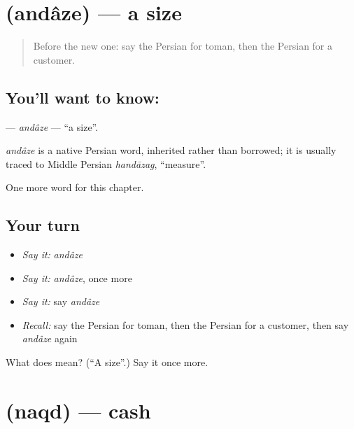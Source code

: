 \section[\texorpdfstring{\fa{اندازه} (andâze)}{اندازه (andâze)}]{ (andâze) — a size}

\label{lesson:FA-C166-andaze}



\begin{quote}
Before the new one: say the Persian for toman, then the Persian for a customer.
\end{quote}

\subsection*{You'll want to know: }
\textbf{} — \emph{andâze} — \textquotedblleft{}a size\textquotedblright{}.

\begin{cousinweb}
\emph{andâze} is a native Persian word, inherited rather than borrowed; it is usually traced to Middle Persian \emph{handāzag}, \textquotedblleft{}measure\textquotedblright{}.
\end{cousinweb}

\begin{grammarlens}[title={What you've built}]
One more word for this chapter.
\end{grammarlens}

\subsection*{Your turn}
\begin{itemize}
\raggedright
  \item \emph{Say it:} \emph{andâze}
  \item \emph{Say it:} \emph{andâze}, once more
  \item \emph{Say it:} say \emph{andâze}
  \item \emph{Recall:} say the Persian for toman, then the Persian for a customer, then say \emph{andâze} again
\end{itemize}

\begin{tcolorbox}[breakable,colback=teal!4,colframe=teal!35!black,title={Before you move on}]
What does  mean? (\textquotedblleft{}A size\textquotedblright{}.) Say it once more.
\end{tcolorbox}
\section[\texorpdfstring{\fa{نقد} (naqd)}{نقد (naqd)}]{ (naqd) — cash}

